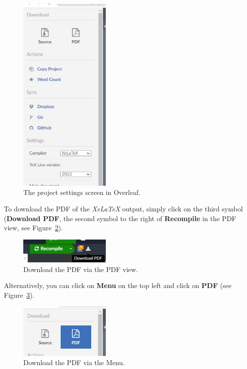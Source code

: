 \begin{figure}[H]\centering
\includegraphics[width=0.4\textwidth]{images/projectsettings.jpg}
\caption{The project settings screen in Overleaf.}
\label{projectsettings:fig}
\end{figure}



To download the PDF of the \textit{XeLaTeX} output, simply click on the third symbol (\textbf{Download PDF}, the second symbol to the right of \textbf{Recompile} in the PDF view, see Figure~\ref{downloadpdf:fig}).


\begin{figure}[H]\centering
\includegraphics[width=0.4\textwidth]{images/downloadPDF.jpg}
\caption{Download the PDF via the PDF view.}
\label{downloadpdf:fig}
\end{figure}


Alternatively, you can click on \textbf{Menu} on the top left and click on \textbf{PDF} (see Figure~\ref{downloadpdfmenu:fig}).

\begin{figure}[H]\centering
\includegraphics[width=0.4\textwidth]{images/downloadPDF2.jpg}
\caption{Download the PDF via the Menu.}
\label{downloadpdfmenu:fig}
\end{figure}

